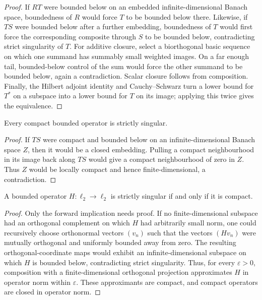 \begin{proof}
If $RT$ were bounded below on an embedded infinite-dimensional Banach space, boundedness of $R$
would force $T$ to be bounded below there.  Likewise, if $TS$ were bounded below after a further
embedding, boundedness of $T$ would first force the corresponding composite through $S$ to be
bounded below, contradicting strict singularity of $T$.  For additive closure, select a
biorthogonal basic sequence on which one summand has summably small weighted images.  On a far
enough tail, bounded-below control of the sum would force the other summand to be bounded below,
again a contradiction.  Scalar closure follows from composition.  Finally, the Hilbert adjoint
identity and Cauchy--Schwarz turn a lower bound for $T^*$ on a subspace into a lower bound for
$T$ on its image; applying this twice gives the equivalence.
\end{proof}

\begin{lemma}\label{lem:compact-strictly-singular}
Every compact bounded operator is strictly singular.
\leanok
\end{lemma}

\begin{proof}
If $TS$ were compact and bounded below on an infinite-dimensional Banach space $Z$, then it would
be a closed embedding.  Pulling a compact neighbourhood in its image back along $TS$ would give a
compact neighbourhood of zero in $Z$.  Thus $Z$ would be locally compact and hence
finite-dimensional, a contradiction.
\end{proof}

\begin{lemma}
\label{lem:canonical-hilbert-strictly-singular-compact}
A bounded operator $H:\ell_2\to\ell_2$ is strictly singular if and only if it is compact.
\leanok
\end{lemma}

\begin{proof}
Only the forward implication needs proof.  If no finite-dimensional subspace had an orthogonal
complement on which $H$ had arbitrarily small norm, one could recursively choose orthonormal
vectors $(v_n)$ such that the vectors $(Hv_n)$ were mutually orthogonal and uniformly bounded
away from zero.  The resulting orthogonal-coordinate maps would exhibit an
infinite-dimensional subspace on which $H$ is bounded below, contradicting strict singularity.
Thus, for every $\varepsilon>0$, composition with a finite-dimensional orthogonal projection
approximates $H$ in operator norm within $\varepsilon$.  These approximants are compact, and
compact operators are closed in operator norm.
\end{proof}

